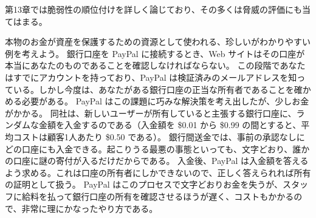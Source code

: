 \documentclass[uplatex]{jsarticle}
\def\label#1{}%
\begin{document}
第13章では脆弱性の順位付けを詳しく論じており、その多くは脅威の評価にも当てはまる。

\begin{exa}\label{exa:ch2-paypal-deposit}
本物のお金が資産を保護するための資源として使われる、珍しいがわかりやすい例を考えよう。
銀行口座を PayPal に接続するとき、Web サイトはその口座が本当にあなたのものであることを確認しなければならない。
この段階であなたはすでにアカウントを持っており、PayPal は検証済みのメールアドレスを知っている。しかし今度は、あなたがある銀行口座の正当な所有者であることを確かめる必要がある。
PayPal はこの課題に巧みな解決策を考え出したが、少しお金がかかる。
同社は、新しいユーザーが所有していると主張する銀行口座に、ランダムな金額を入金するのである（入金額を \$0.01 から \$0.99 の間とすると、平均コストは顧客1人あたり \$0.50 である）。
銀行間送金では、事前の承認なしにどの口座にも入金できる。起こりうる最悪の事態といっても、文字どおり、誰かの口座に謎の寄付が入るだけだからである。
入金後、PayPal は入金額を答えるよう求める。これは口座の所有者にしかできないので、正しく答えられれば所有の証明として扱う。
PayPal はこのプロセスで文字どおりお金を失うが、スタッフに給料を払って銀行口座の所有を確認させるほうが遅く、コストもかかるので、非常に理にかなったやり方である。
\end{exa}
\end{document}
